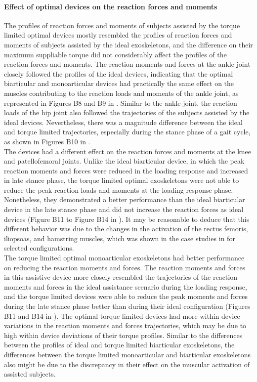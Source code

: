 \documentclass[10pt,letterpaper]{article}
\begin{document}
\paragraph{Effect of optimal devices on the reaction forces and moments} The profiles of reaction forces and moments of subjects assisted by the torque limited optimal devices mostly resembled the profiles of reaction forces and moments of subjects assisted by the ideal exoskeletons, and the difference on their maximum suppliable torque did not considerably affect the profiles of the reaction forces and moments. The reaction moments and forces at the ankle joint closely followed the profiles of the ideal devices, indicating that the optimal biarticular and monoarticular devices had practically the same effect on the muscles contributing to the reaction loads and moments of the ankle joint, as represented in Figures B8 and B9 in .  Similar to the ankle joint, the reaction loads of the hip joint also followed the trajectories of the subjects assisted by the ideal devices. Nevertheless, there was a magnitude difference between the ideal and torque limited trajectories, especially during the stance phase of a gait cycle, as shown in Figures B10 in .\\
The devices had a different effect on the reaction forces and moments at the knee and patellofemoral joints. Unlike the ideal biarticular device, in which the peak reaction moments and forces were reduced in the loading response and increased in late stance phase, the torque limited optimal exoskeletons were not able to reduce the peak reaction loads and moments at the loading response phase. Nonetheless, they demonstrated a better performance than the ideal biarticular device in the late stance phase and did not increase the reaction forces as ideal devices (Figure B11 to Figure B14 in ). It may be reasonable to deduce that this different behavior was due to the changes in the activation of the rectus femoris, iliopsoas, and hamstring muscles, which was shown in the case studies in  for selected configurations.\\
The torque limited optimal monoarticular exoskeletons had better performance on reducing the reaction moments and forces. The reaction moments and forces in this assistive device more closely resembled the trajectories of the reaction moments and forces in the ideal assistance scenario during the loading response, and the torque limited devices were able to reduce the peak moments and forces during the late stance phase better than during their ideal configuration (Figures B11 and B14 in ). The optimal torque limited devices had more within device variations in the reaction moments and forces trajectories, which may be due to high within device deviations of their torque profiles. Similar to the differences between the profiles of ideal and torque limited biarticular exoskeletons, the differences between the torque limited monoarticular and biarticular exoskeletons also might be due to the discrepancy in their effect on the muscular activation of assisted subjects.
\end{document}
